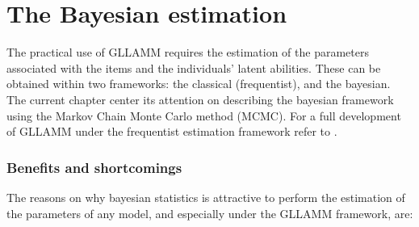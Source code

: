 \chapter{The Bayesian estimation } \label{chap:estimation}

The practical use of GLLAMM requires the estimation of the parameters associated with the items and the individuals' latent abilities. These can be obtained within two frameworks: the classical (frequentist), and the bayesian. The current chapter center its attention on describing the bayesian framework using the Markov Chain Monte Carlo method (MCMC). For a full development of GLLAMM under the frequentist estimation framework refer to \citet{Rabe_et_al_2004a, Rabe_et_al_2004b, Skrondal_et_al_2004a, Rabe_et_al_2012}.


\subsection{Benefits and shortcomings}

The reasons on why bayesian statistics is attractive to perform the estimation of the parameters of any model, and especially under the GLLAMM framework, are:

